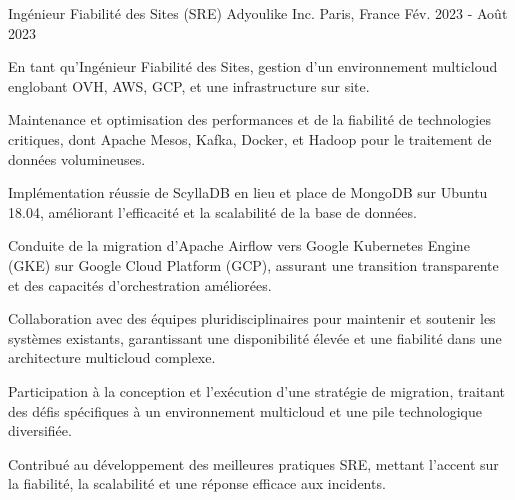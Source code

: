 \begin{cventries}
  \cventry
    {Ingénieur Fiabilité des Sites (SRE)} %
    {Adyoulike Inc.} %
    {Paris, France} %
    {Fév. 2023 - Août 2023} %
    {
      \begin{cvitems} %
        \item {En tant qu'Ingénieur Fiabilité des Sites, gestion d'un environnement multicloud englobant OVH, AWS, GCP, et une infrastructure sur site.}
        \item {Maintenance et optimisation des performances et de la fiabilité de technologies critiques, dont Apache Mesos, Kafka, Docker, et Hadoop pour le traitement de données volumineuses.}
        \item {Implémentation réussie de ScyllaDB en lieu et place de MongoDB sur Ubuntu 18.04, améliorant l'efficacité et la scalabilité de la base de données.}
        \item {Conduite de la migration d'Apache Airflow vers Google Kubernetes Engine (GKE) sur Google Cloud Platform (GCP), assurant une transition transparente et des capacités d'orchestration améliorées.}
        \item {Collaboration avec des équipes pluridisciplinaires pour maintenir et soutenir les systèmes existants, garantissant une disponibilité élevée et une fiabilité dans une architecture multicloud complexe.}
        \item {Participation à la conception et l'exécution d'une stratégie de migration, traitant des défis spécifiques à un environnement multicloud et une pile technologique diversifiée.}
        \item {Contribué au développement des meilleures pratiques SRE, mettant l'accent sur la fiabilité, la scalabilité et une réponse efficace aux incidents.}
      \end{cvitems}
    }


\end{cventries}
